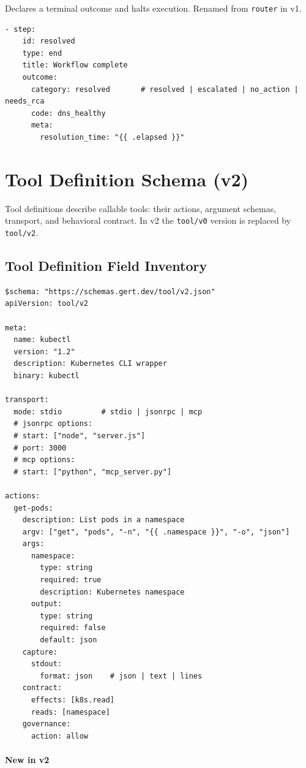 Declares a terminal outcome and halts execution.  Renamed from \texttt{router}
in v1.

\begin{verbatim}
- step:
    id: resolved
    type: end
    title: Workflow complete
    outcome:
      category: resolved       # resolved | escalated | no_action | needs_rca
      code: dns_healthy
      meta:
        resolution_time: "{{ .elapsed }}"
\end{verbatim}

\section{Tool Definition Schema (v2)}
\label{sec:tool-schema}

Tool definitions describe callable tools: their actions, argument schemas,
transport, and behavioral contract.  In v2 the \texttt{tool/v0} version is
replaced by \texttt{tool/v2}.

\subsection{Tool Definition Field Inventory}
\label{subsec:tool-fields}

\begin{verbatim}
$schema: "https://schemas.gert.dev/tool/v2.json"
apiVersion: tool/v2

meta:
  name: kubectl
  version: "1.2"
  description: Kubernetes CLI wrapper
  binary: kubectl

transport:
  mode: stdio         # stdio | jsonrpc | mcp
  # jsonrpc options:
  # start: ["node", "server.js"]
  # port: 3000
  # mcp options:
  # start: ["python", "mcp_server.py"]

actions:
  get-pods:
    description: List pods in a namespace
    argv: ["get", "pods", "-n", "{{ .namespace }}", "-o", "json"]
    args:
      namespace:
        type: string
        required: true
        description: Kubernetes namespace
      output:
        type: string
        required: false
        default: json
    capture:
      stdout:
        format: json    # json | text | lines
    contract:
      effects: [k8s.read]
      reads: [namespace]
    governance:
      action: allow
\end{verbatim}

\paragraph{New in v2}

